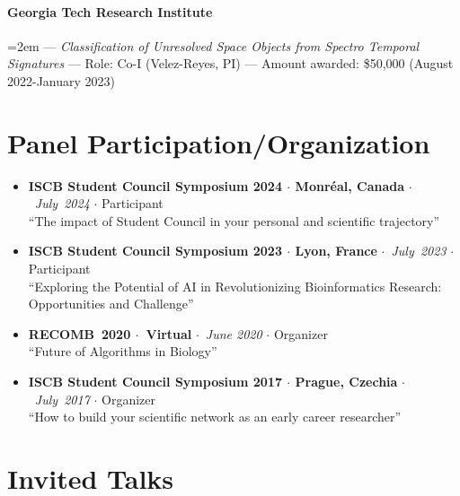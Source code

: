 \documentclass[10pt,letterpaper]{article}
\newcommand{\bigdot}{$\cdot$\xspace}
\begin{document}
\paragraph{Georgia Tech Research Institute}  \hangindent=2em  --- 
	\textit{Classification of Unresolved Space Objects from Spectro Temporal Signatures} ---
	Role: Co-I (Velez-Reyes, PI) --- Amount awarded: \$50,000 (August 2022-January 2023)



\section*{Panel Participation/Organization}
\begin{itemize}[leftmargin=*,labelindent=5pt,itemindent=-15pt]
  \item \textbf{ISCB Student Council Symposium 2024 \bigdot  Monr\'eal, Canada} \bigdot~\textit{July~2024} \bigdot Participant \\ ``The impact of Student Council in your personal and scientific trajectory''  
  \item \textbf{ISCB Student Council Symposium 2023 \bigdot  Lyon, France} \bigdot~\textit{July~2023} \bigdot Participant  \\ ``Exploring the Potential of AI in Revolutionizing Bioinformatics Research: Opportunities and Challenge''
  \item \textbf{RECOMB~2020 \bigdot~Virtual} \bigdot~\textit{June 2020} \bigdot  Organizer  \\ ``Future of Algorithms in Biology''
    \item \textbf{ISCB Student Council Symposium 2017 \bigdot Prague, Czechia} \bigdot~\textit{July~2017} \bigdot Organizer  \\ ``How to build your scientific network as an early career researcher''
\end{itemize}

\section*{Invited Talks}
\end{document}
